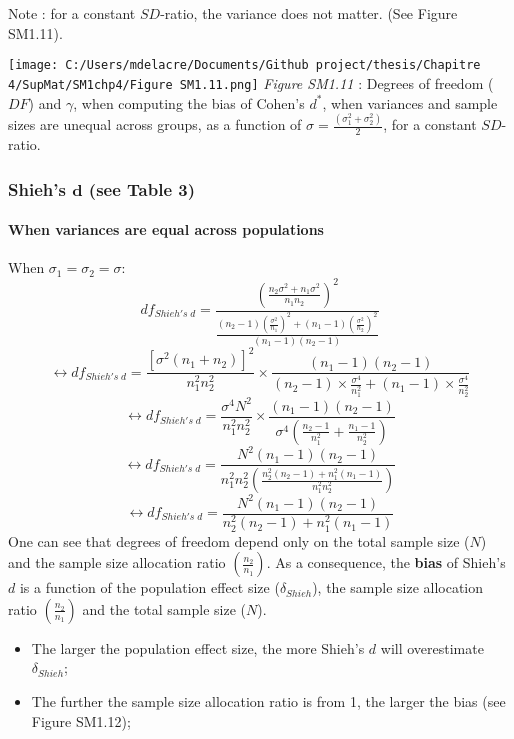 \documentclass[
  english,
  man,mask,floatsintext]{apa6}
\providecommand{\tightlist}{%
  \setlength{\itemsep}{0pt}\setlength{\parskip}{0pt}}
\let\oldparagraph\paragraph
\renewcommand{\paragraph}[1]{\oldparagraph{#1}\mbox{}}
\begin{document}
\newpage

Note : for a constant \(SD\)-ratio, the variance does not matter. (See Figure SM1.11).

\texttt{[image: C:/Users/mdelacre/Documents/Github project/thesis/Chapitre 4/SupMat/SM1chp4/Figure SM1.11.png]}
\emph{Figure SM1.11} : Degrees of freedom (\(DF\)) and \(\gamma\), when computing the bias of Cohen's \(d^*\), when variances and sample sizes are unequal across groups, as a function of \(\sigma= \frac{(\sigma_1^2+\sigma_2^2)}{2}\), for a constant \(SD\)-ratio.

\hypertarget{shiehs-bmd-see-table-3}{%
\subsubsection{\texorpdfstring{Shieh's \(\bm{d}\) (see Table 3)}{Shieh's \textbackslash bm\{d\} (see Table 3)}}\label{shiehs-bmd-see-table-3}}

\hypertarget{when-variances-are-equal-across-populations-1}{%
\paragraph{When variances are equal across populations}\label{when-variances-are-equal-across-populations-1}}

When \(\sigma_1=\sigma_2=\sigma\):
\[df_{Shieh's \; d} = \frac{\left( \frac{n_2\sigma^2+n_1\sigma^2}{n_1n_2}\right)^2}{\frac{(n_2-1)\left( \frac{\sigma^2}{n_1}\right)^2+(n_1-1)\left( \frac{\sigma^2}{n_2}\right)^2}{(n_1-1)(n_2-1)}}\]
\[\leftrightarrow df_{Shieh's \; d} = \frac{[\sigma^2(n_1+n_2)]^2}{n_1^2n_2^2} \times \frac{(n_1-1)(n_2-1)}{(n_2-1) \times  \frac{\sigma^4}{n_1^2}+(n_1-1) \times \frac{\sigma^4}{n_2^2}}\]
\[\leftrightarrow df_{Shieh's \; d} = \frac{\sigma^4N^2}{n_1^2n_2^2} \times \frac{(n_1-1)(n_2-1)}{\sigma^4 \left( \frac{n_2-1}{n^2_1}+\frac{n_1-1}{n^2_2}\right) }\]
\[\leftrightarrow df_{Shieh's \; d} = \frac{N^2(n_1-1)(n_2-1)}{n_1^2n_2^2 \left( \frac{n_2^2(n_2-1)+n_1^2(n_1-1)}{n_1^2n_2^2}\right)}\]
\[\leftrightarrow df_{Shieh's \; d} = \frac{N^2(n_1-1)(n_2-1)}{n_2^2(n_2-1)+n_1^2(n_1-1)}\]
One can see that degrees of freedom depend only on the total sample size (\(N\)) and the sample size allocation ratio \(\left( \frac{n_2}{n_1}\right)\). As a consequence, the \textbf{bias} of Shieh's \(d\) is a function of the population effect size (\(\delta_{Shieh}\)), the sample size allocation ratio \(\left( \frac{n_2}{n_1}\right)\) and the total sample size (\(N\)).

\begin{itemize}
\tightlist
\item
  The larger the population effect size, the more Shieh's \(d\) will overestimate \(\delta_{Shieh}\);
\item
  The further the sample size allocation ratio is from 1, the larger the bias (see Figure SM1.12);
\end{itemize}
\end{document}
